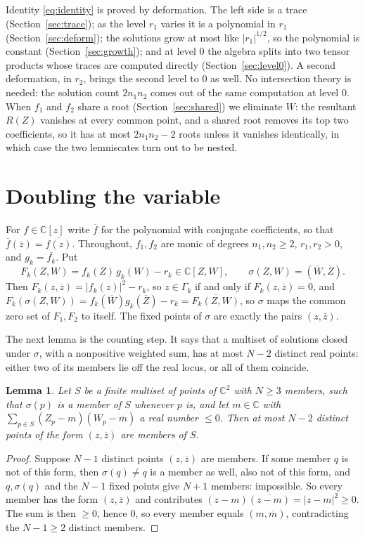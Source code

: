 \documentclass[11pt]{amsart}
\newtheorem{lemma}[theorem]{Lemma}
\theoremstyle{remark}\newtheorem{remark}[theorem]{Remark}
\theoremstyle{definition}\newtheorem{example}[theorem]{Example}
\newcommand{\C}{\mathbb{C}}
\newcommand{\cl}{\overline}
\begin{document}
Identity \eqref{eq:identity} is proved by deformation. The left side is a trace (Section~\ref{sec:trace}); as the level
$r_1$ varies it is a polynomial in $r_1$ (Section~\ref{sec:deform}); the solutions grow at most like $|r_1|^{1/2}$,
so the polynomial is constant (Section~\ref{sec:growth}); and at level $0$ the algebra splits into two tensor products
whose traces are computed directly (Section~\ref{sec:level0}). A second deformation, in $r_2$, brings the second
level to $0$ as well. No intersection theory is needed: the solution count $2n_1n_2$ comes out of the same
computation at level $0$. When $f_1$ and $f_2$ share a root (Section~\ref{sec:shared}) we eliminate $W$: the
resultant $R(Z)$ vanishes at every common point, and a shared root removes its top two coefficients, so it has at
most $2n_1n_2-2$ roots unless it vanishes identically, in which case the two lemniscates turn out to be nested.

\section{Doubling the variable}\label{sec:pairing}

For $f\in\C[z]$ write $\cl f$ for the polynomial with conjugate coefficients, so that $\cl f(\cl z)=\cl{f(z)}$.
Throughout, $f_1,f_2$ are monic of degrees $n_1,n_2\ge2$, $r_1,r_2>0$, and $g_k=\cl{f_k}$. Put
\[
F_k(Z,W)=f_k(Z)\,g_k(W)-r_k\in\C[Z,W],\qquad \sigma(Z,W)=(\cl W,\cl Z).
\]
Then $F_k(z,\cl z)=|f_k(z)|^2-r_k$, so $z\in\Gamma_k$ if and only if $F_k(z,\cl z)=0$, and
$F_k(\sigma(Z,W))=f_k(\cl W)g_k(\cl Z)-r_k=\cl{F_k(Z,W)}$, so $\sigma$ maps the common zero set of $F_1,F_2$ to itself.
The fixed points of $\sigma$ are exactly the pairs $(z,\cl z)$.

The next lemma is the counting step. It says that a multiset of solutions closed under $\sigma$, with a nonpositive
weighted sum, has at most $N-2$ distinct real points: either two of its members lie off the real locus, or all of
them coincide.

\begin{lemma}\label{lem:pairing}
Let $S$ be a finite multiset of points of $\C^2$ with $N\ge3$ members, such that $\sigma(p)$ is a member of $S$
whenever $p$ is, and let $m\in\C$ with $\sum_{p\in S}(Z_p-m)(W_p-\cl m)$ a real number $\le0$. Then at most $N-2$
distinct points of the form $(z,\cl z)$ are members of $S$.
\end{lemma}

\begin{proof}
Suppose $N-1$ distinct points $(z,\cl z)$ are members. If some member $q$ is not of this form, then $\sigma(q)\ne q$
is a member as well, also not of this form, and $q,\sigma(q)$ and the $N-1$ fixed points give $N+1$ members:
impossible. So every member has the form $(z,\cl z)$ and contributes $(z-m)\cl{(z-m)}=|z-m|^2\ge0$. The sum is then
$\ge0$, hence $0$, so every member equals $(m,\cl m)$, contradicting the $N-1\ge2$ distinct members.
\end{proof}
\end{document}
